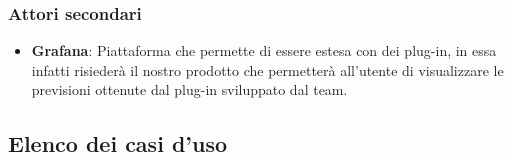 \documentclass[../analisi-dei-requisiti.tex]{subfiles}
\begin{document}
\subsubsection{Attori secondari}
\label{sssec:attori_secondari}
\begin{itemize}
  \item \textbf{Grafana}: Piattaforma che permette di essere estesa con dei plug-in, in essa infatti risiederà il nostro prodotto che permetterà all'utente di visualizzare le previsioni ottenute dal plug-in sviluppato dal team.
\end{itemize}

\newpage

\subsection{Elenco dei casi d'uso}
\label{subs:elenco_dei_casi_duso}


















































\end{document}
